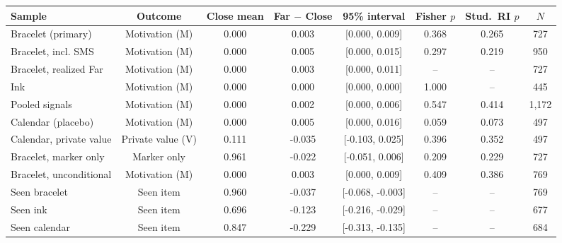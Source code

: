\begin{tabular}{lccccccc}
\toprule
Sample & Outcome & Close mean & Far $-$ Close & 95\% interval & Fisher $p$ & Stud.\ RI $p$ & $N$ \\
\midrule
Bracelet (primary) & Motivation (M) & 0.000 & 0.003 & [0.000, 0.009] & 0.368 & 0.265 & 727 \\
Bracelet, incl. SMS & Motivation (M) & 0.000 & 0.005 & [0.000, 0.015] & 0.297 & 0.219 & 950 \\
Bracelet, realized Far & Motivation (M) & 0.000 & 0.003 & [0.000, 0.011] & -- & -- & 727 \\
Ink & Motivation (M) & 0.000 & 0.000 & [0.000, 0.000] & 1.000 & -- & 445 \\
Pooled signals & Motivation (M) & 0.000 & 0.002 & [0.000, 0.006] & 0.547 & 0.414 & 1,172 \\
Calendar (placebo) & Motivation (M) & 0.000 & 0.005 & [0.000, 0.016] & 0.059 & 0.073 & 497 \\
Calendar, private value & Private value (V) & 0.111 & -0.035 & [-0.103, 0.025] & 0.396 & 0.352 & 497 \\
Bracelet, marker only & Marker only & 0.961 & -0.022 & [-0.051, 0.006] & 0.209 & 0.229 & 727 \\
Bracelet, unconditional & Motivation (M) & 0.000 & 0.003 & [0.000, 0.009] & 0.409 & 0.386 & 769 \\
\addlinespace
Seen bracelet & Seen item & 0.960 & -0.037 & [-0.068, -0.003] & -- & -- & 769 \\
Seen ink & Seen item & 0.696 & -0.123 & [-0.216, -0.029] & -- & -- & 677 \\
Seen calendar & Seen item & 0.847 & -0.229 & [-0.313, -0.135] & -- & -- & 684 \\
\bottomrule
\end{tabular}
